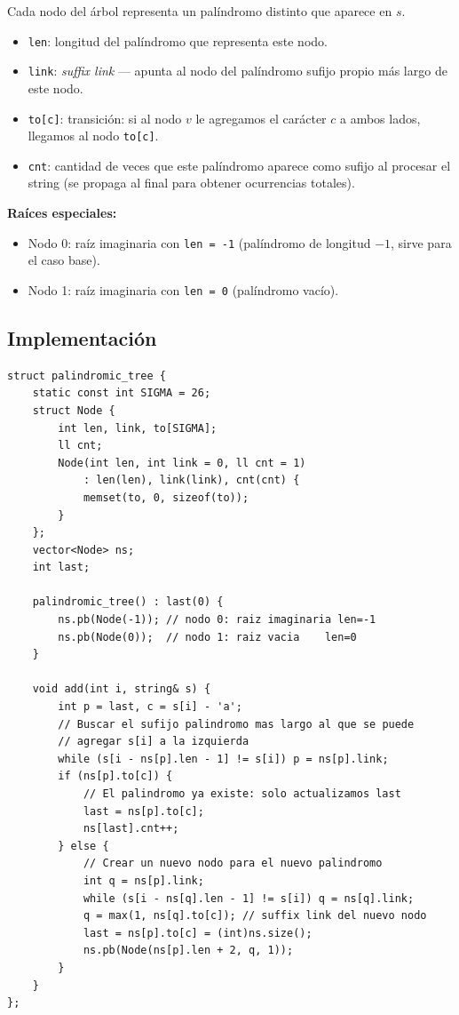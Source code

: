 Cada nodo del árbol representa un palíndromo distinto que aparece en $s$.

\begin{itemize}
    \item \texttt{len}: longitud del palíndromo que representa este nodo.
    \item \texttt{link}: \textit{suffix link} — apunta al nodo del palíndromo sufijo propio más largo de este nodo.
    \item \texttt{to[c]}: transición: si al nodo $v$ le agregamos el carácter $c$ a ambos lados, llegamos al nodo \texttt{to[c]}.
    \item \texttt{cnt}: cantidad de veces que este palíndromo aparece como sufijo al procesar el string (se propaga al final para obtener ocurrencias totales).
\end{itemize}

\textbf{Raíces especiales:}
\begin{itemize}
    \item Nodo 0: raíz imaginaria con \texttt{len = -1} (palíndromo de longitud $-1$, sirve para el caso base).
    \item Nodo 1: raíz imaginaria con \texttt{len = 0} (palíndromo vacío).
\end{itemize}

\subsection{Implementación}

\begin{lstlisting}[style=cppstyle, caption={Palindromic Tree (Eertree)}]
struct palindromic_tree {
    static const int SIGMA = 26;
    struct Node {
        int len, link, to[SIGMA];
        ll cnt;
        Node(int len, int link = 0, ll cnt = 1)
            : len(len), link(link), cnt(cnt) {
            memset(to, 0, sizeof(to));
        }
    };
    vector<Node> ns;
    int last;

    palindromic_tree() : last(0) {
        ns.pb(Node(-1)); // nodo 0: raiz imaginaria len=-1
        ns.pb(Node(0));  // nodo 1: raiz vacia    len=0
    }

    void add(int i, string& s) {
        int p = last, c = s[i] - 'a';
        // Buscar el sufijo palindromo mas largo al que se puede
        // agregar s[i] a la izquierda
        while (s[i - ns[p].len - 1] != s[i]) p = ns[p].link;
        if (ns[p].to[c]) {
            // El palindromo ya existe: solo actualizamos last
            last = ns[p].to[c];
            ns[last].cnt++;
        } else {
            // Crear un nuevo nodo para el nuevo palindromo
            int q = ns[p].link;
            while (s[i - ns[q].len - 1] != s[i]) q = ns[q].link;
            q = max(1, ns[q].to[c]); // suffix link del nuevo nodo
            last = ns[p].to[c] = (int)ns.size();
            ns.pb(Node(ns[p].len + 2, q, 1));
        }
    }
};
\end{lstlisting}


